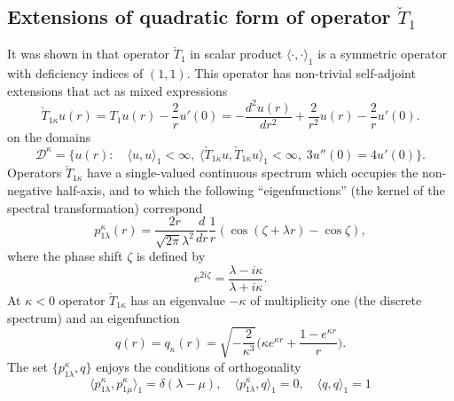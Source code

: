 \documentclass[12pt]{article}
\newcommand{\DD}{\mathcal{D}}
\begin{document}
\subsection{Extensions of quadratic form of operator $ \check{T}_{1} $}
	It was shown in
\cite{Inv}
	that operator
$ \check{T}_{1} $
	in scalar product
$ \langle \cdot , \cdot \rangle_{1} $
	is a symmetric operator with deficiency indices of
$ (1,1) $.
	This operator has non-trivial self-adjoint extensions
	that act as mixed expressions
\begin{equation}
\label{Text}
    \check{T}_{1\kappa} u(r) = T_{1} u(r) - \frac{2}{r} u'(0)
    = -\frac{d^{2}u(r)}{dr^{2}} + \frac{2}{r^{2}} u(r) -\frac{2}{r}u'(0) .
\end{equation}
	on the domains
\begin{equation}
\label{cTb}
    \DD^{\kappa} = \{u(r): \quad \langle u,u\rangle_{1} < \infty, \;
	\langle \check{T}_{1\kappa} u, \check{T}_{1\kappa} u\rangle_{1} <\infty,
	\; 3u''(0) = 4u'(0) \} .
\end{equation}
	Operators
$ \check{T}_{1\kappa} $
have a single-valued continuous spectrum which occupies the non-negative
    half-axis, and to which the following ``eigenfunctions'' (the kernel
    of the spectral transformation) correspond
\begin{equation*}
\label{Tpl}
    p_{1\lambda}^{\kappa}(r)
        = \frac{2r}{\sqrt{2\pi}\lambda^{2}} \frac{d}{dr}\frac{1}{r}
    (\cos(\zeta +\lambda r) - \cos\zeta) ,
\end{equation*}
	where the phase shift
$ \zeta $
    is defined by
\begin{equation*}
    e^{2i\zeta} = \frac{\lambda - i\kappa}{\lambda + i\kappa}.
\end{equation*}
	At
$ \kappa < 0 $
	operator
$ \check{T}_{1\kappa} $
	has an eigenvalue
$ -\kappa $
    of multiplicity one
	(the discrete spectrum) and an eigenfunction
\begin{equation*}
    q(r) = q_{\kappa}(r)
    = \sqrt{-\frac{2}{\kappa^{3}}}
        \bigl(\kappa e^{\kappa r} + \frac{1-e^{\kappa r}}{r}\bigr) .
\end{equation*}
	The set
$ \{p_{1\lambda}^{\kappa}, q \} $
	enjoys the conditions of orthogonality
\begin{equation*}
    \langle p_{1\lambda}^{\kappa} , p_{1\mu}^{\kappa} \rangle_{1}
	= \delta(\lambda-\mu) ,
    \quad \langle p_{1\lambda}^{\kappa} , q \rangle_{1} = 0 ,
    \quad \langle q , q \rangle_{1} = 1
\end{equation*}
\end{document}
